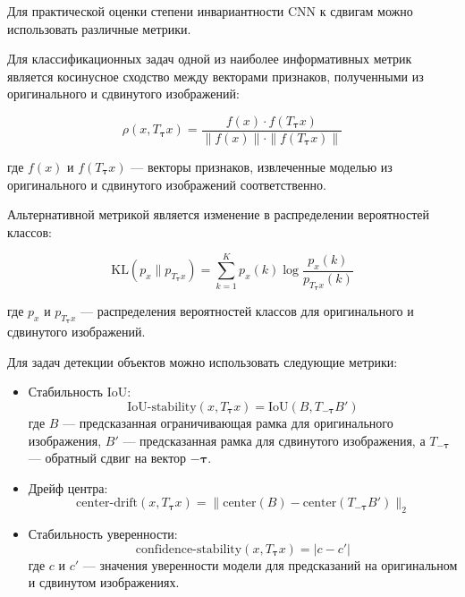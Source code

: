 Для практической оценки степени инвариантности CNN к сдвигам можно использовать различные метрики.

Для классификационных задач одной из наиболее информативных метрик является косинусное сходство между векторами признаков, полученными из оригинального и сдвинутого изображений:

\begin{equation}
\rho(x, T_{\boldsymbol{\tau}}x) = \frac{f(x) \cdot f(T_{\boldsymbol{\tau}}x)}{\|f(x)\| \cdot \|f(T_{\boldsymbol{\tau}}x)\|}
\end{equation}

где $f(x)$ и $f(T_{\boldsymbol{\tau}}x)$ — векторы признаков, извлеченные моделью из оригинального и сдвинутого изображений соответственно.

Альтернативной метрикой является изменение в распределении вероятностей классов:

\begin{equation}
\text{KL}(p_x \| p_{T_{\boldsymbol{\tau}}x}) = \sum_{k=1}^K p_x(k) \log \frac{p_x(k)}{p_{T_{\boldsymbol{\tau}}x}(k)}
\end{equation}

где $p_x$ и $p_{T_{\boldsymbol{\tau}}x}$ — распределения вероятностей классов для оригинального и сдвинутого изображений.

Для задач детекции объектов можно использовать следующие метрики:

\begin{itemize}
    \item Стабильность IoU:
    \begin{equation}
    \text{IoU-stability}(x, T_{\boldsymbol{\tau}}x) = \text{IoU}(B, T_{-\boldsymbol{\tau}}B')
    \end{equation}
    где $B$ — предсказанная ограничивающая рамка для оригинального изображения, $B'$ — предсказанная рамка для сдвинутого изображения, а $T_{-\boldsymbol{\tau}}$ — обратный сдвиг на вектор $-\boldsymbol{\tau}$.
    
    \item Дрейф центра:
    \begin{equation}
    \text{center-drift}(x, T_{\boldsymbol{\tau}}x) = \|\text{center}(B) - \text{center}(T_{-\boldsymbol{\tau}}B')\|_2
    \end{equation}
    
    \item Стабильность уверенности:
    \begin{equation}
    \text{confidence-stability}(x, T_{\boldsymbol{\tau}}x) = |c - c'|
    \end{equation}
    где $c$ и $c'$ — значения уверенности модели для предсказаний на оригинальном и сдвинутом изображениях.
\end{itemize}

